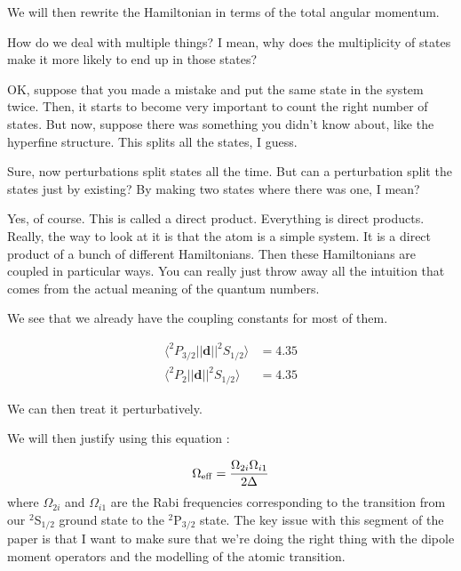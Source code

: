We will then rewrite the Hamiltonian in terms of the total angular momentum. 

How do we deal with multiple things? I mean, why does the multiplicity of states make it more likely to end up in those states? 

OK, suppose that you made a mistake and put the same state in the system twice. Then, it starts to become very important to count the right number of states. But now, suppose there was something you didn't know about, like the hyperfine structure. This splits all the states, I guess. 

Sure, now perturbations split states all the time. But can a perturbation split the states just by existing? By making two states where there was one, I mean? 

Yes, of course. This is called a direct product. Everything is direct products. Really, the way to look at it is that the atom is a simple system. It is a direct product of a bunch of different Hamiltonians. Then these Hamiltonians are coupled in particular ways. You can really just throw away all the intuition that comes from the actual meaning of the quantum numbers. 


We see that we already have the coupling constants for most of them. %

\begin{align}
\langle ^2 P_{3/2}||\mathbf{d}||^2 S_{1/2} \rangle &= 4.35 \\
\langle ^2 P_{2}||\mathbf{d}||^2 S_{1/2} \rangle &= 4.35
\end{align}

We can then treat it perturbatively. 

We will then justify using this equation \cite{footAtomicPhysics} \cite{RamanBeamSplit}: 

\begin{equation}
\Omega_{\rm eff}=\frac{\Omega_{2i} \Omega_{i1}}{2 \Delta}
\end{equation}
where $\Omega_{2i}$ and $\Omega_{i1}$ are the Rabi frequencies corresponding to the transition from our $^2$S$_{1/2}$ ground state to the  $^2$P$_{3/2}$ state. 
The key issue with this segment of the paper is that I want to make sure that we're doing the right thing with the dipole moment operators and the modelling of the atomic transition.  %

